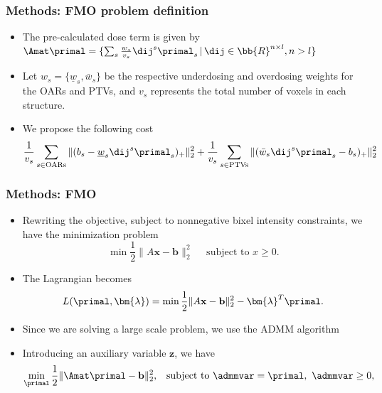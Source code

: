 \begin{frame}
\frametitle{Methods: FMO problem definition}
\begin{itemize}
	\item The pre-calculated dose term is given by $\Amat\primal = \{\sum_s\frac{w_s}{v_s} \dij^s \primal_s  \, | \, \dij \in \bb{R}^{n \times l}, n>l\}$%
	
	\vspace{0.2cm}
	\item Let $w_s = \{\underline{w}_s, \bar{w}_s\}$ be the respective underdosing and overdosing weights for the OARs and PTVs, and $v_s$ represents the total number of voxels in each structure.
	\vspace{0.2cm}
	\item We propose the following cost
	\small \begin{align}
	\frac{1}{v_s}\sum_{s \in \text{OARs}}  \|(b_s - \underline{w}_s \dij^s \primal_s)_+ \|_2^2 + \frac{1}{v_s}\sum_{s \in \text{PTVs}}  \|(\bar{w}_s \dij^s \primal_s - b_s)_+\|_2^2 
	\label{eq:fmo_cost}
	\end{align}
\end{itemize}
\end{frame}

\begin{frame}
\frametitle{Methods: FMO}
	\begin{itemize}
		\item Rewriting the objective, subject to nonnegative bixel intensity constraints, we have the minimization problem
		\[
		\min \frac{1}{2}\|A \textbf{x} - \textbf{b}\|_2^2  \quad \text{ subject to }  x \ge 0.
		\]
		\item The Lagrangian becomes
		\[
		L(\primal, \bm{\lambda}) = \min \frac{1}{2}\|A \textbf{x} - \textbf{b}\|_2^2 - \bm{\lambda}^T \primal.
		\]
		\item Since we are solving a large scale problem, we use the ADMM algorithm
		\item Introducing an auxiliary variable $\textbf{z}$, we have 
		\begin{align}
		\min_{\primal} \frac{1}{2}\|\Amat \primal - \textbf{b}\|_2^2,
		\,\,\, \text{ subject to }  \admmvar = \primal, \,\, \admmvar \ge 0, \nonumber
		\end{align}
	\end{itemize}
\end{frame}


